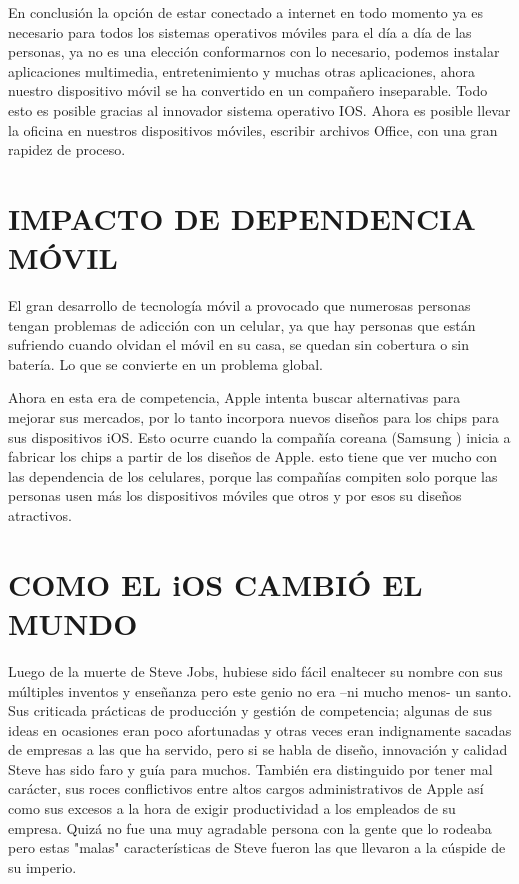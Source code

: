 En conclusión la opción de estar conectado a internet en todo
momento ya es necesario para todos los sistemas operativos
móviles para el día a día de las personas, ya no es una elección
conformarnos con lo necesario, podemos instalar aplicaciones
multimedia, entretenimiento y muchas otras aplicaciones, ahora
nuestro dispositivo móvil se ha convertido en un compañero
inseparable. Todo esto es posible gracias al innovador sistema
operativo IOS. Ahora es posible llevar la oficina en nuestros
dispositivos móviles, escribir archivos Office, con una gran
rapidez de proceso.

\section*{IMPACTO DE DEPENDENCIA MÓVIL}

El gran desarrollo de tecnología móvil a provocado que
numerosas personas tengan problemas de adicción con un
celular, ya que hay personas que están sufriendo cuando olvidan
el móvil en su casa, se quedan sin cobertura o sin batería. Lo
que se convierte en un problema global.

Ahora en esta era de competencia, Apple intenta buscar
alternativas para mejorar sus mercados, por lo tanto incorpora
nuevos diseños para los chips para sus dispositivos iOS. Esto
ocurre cuando la compañía coreana (Samsung ) inicia a fabricar
los chips a partir de los diseños de Apple. esto tiene que ver
mucho con las dependencia de los celulares, porque las
compañías compiten solo porque las personas usen más los
dispositivos móviles que otros y por esos su diseños atractivos.

\section*{COMO EL iOS CAMBIÓ EL MUNDO}

Luego de la muerte de Steve Jobs, hubiese sido fácil enaltecer
su nombre con sus múltiples inventos y enseñanza pero este
genio no era –ni mucho menos- un santo. Sus criticada prácticas
de producción y gestión de competencia; algunas de sus ideas
en ocasiones eran poco afortunadas y otras veces eran
indignamente sacadas de empresas a las que ha servido, pero si
se habla de diseño, innovación y calidad Steve has sido faro y
guía para muchos. También era distinguido por tener mal
carácter, sus roces conflictivos entre altos cargos
administrativos de Apple así como sus excesos a la hora de
exigir productividad a los empleados de su empresa. Quizá no
fue una muy agradable persona con la gente que lo rodeaba
pero estas "malas" características de Steve fueron las que
llevaron a la cúspide de su imperio.

